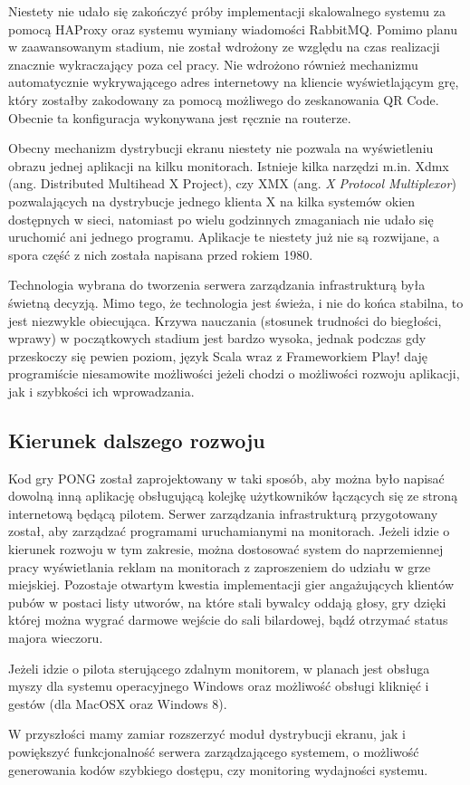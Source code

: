 Niestety nie udało się zakończyć próby implementacji skalowalnego systemu za pomocą HAProxy oraz systemu wymiany wiadomości RabbitMQ. Pomimo planu w zaawansowanym stadium, nie został wdrożony ze względu na czas realizacji znacznie wykraczający poza cel pracy. Nie wdrożono również mechanizmu automatycznie wykrywającego adres internetowy na kliencie wyświetlającym grę, który zostałby zakodowany za pomocą możliwego do zeskanowania QR Code. Obecnie ta konfiguracja wykonywana jest ręcznie na routerze.

Obecny mechanizm dystrybucji ekranu niestety nie pozwala na wyświetleniu obrazu jednej aplikacji na kilku monitorach. Istnieje kilka narzędzi m.in. Xdmx (ang. Distributed Multihead X Project), czy XMX (ang. \emph{X Protocol Multiplexor}) pozwalających na dystrybucje jednego klienta X na kilka systemów okien dostępnych w sieci, natomiast po wielu godzinnych zmaganiach nie udało się uruchomić ani jednego programu. Aplikacje te niestety już nie są rozwijane, a spora część z nich została napisana przed rokiem 1980.

Technologia wybrana do tworzenia serwera zarządzania infrastrukturą była świetną decyzją. Mimo tego, że technologia jest świeża, i nie do końca stabilna, to jest niezwykle obiecująca. Krzywa nauczania (stosunek trudności do biegłości, wprawy) w początkowych stadium jest bardzo wysoka, jednak podczas gdy przeskoczy się pewien poziom, język Scala wraz z Frameworkiem Play! daję programiście niesamowite możliwości jeżeli chodzi o możliwości rozwoju aplikacji, jak i szybkości ich wprowadzania.

\subsection{Kierunek dalszego rozwoju}

Kod gry PONG został zaprojektowany w taki sposób, aby można było napisać dowolną inną aplikację obsługującą kolejkę użytkowników łączących się ze stroną internetową będącą pilotem. Serwer zarządzania infrastrukturą przygotowany został, aby zarządzać programami uruchamianymi na monitorach. Jeżeli idzie o kierunek rozwoju w tym zakresie, można dostosować system do naprzemiennej pracy wyświetlania reklam na monitorach z zaproszeniem do udziału w grze miejskiej. Pozostaje otwartym kwestia implementacji gier angażujących klientów pubów w postaci listy utworów, na które stali bywalcy oddają głosy, gry dzięki której można wygrać darmowe wejście do sali bilardowej, bądź otrzymać status majora wieczoru.

Jeżeli idzie o pilota sterującego zdalnym monitorem, w planach jest obsługa myszy dla systemu operacyjnego Windows oraz możliwość obsługi kliknięć i gestów (dla MacOSX oraz Windows 8).

W przyszłości mamy zamiar rozszerzyć moduł dystrybucji ekranu, jak i powiększyć funkcjonalność serwera zarządzającego systemem, o możliwość generowania kodów szybkiego dostępu, czy monitoring wydajności systemu. 



